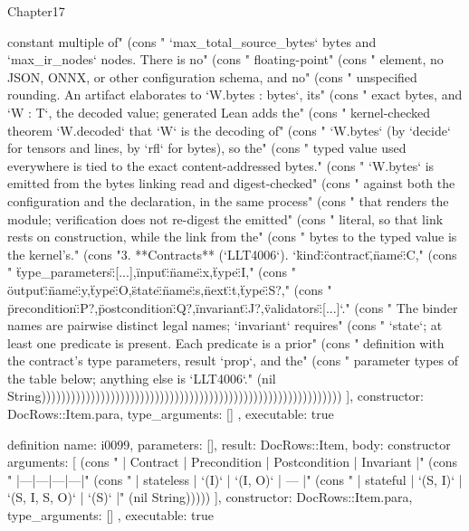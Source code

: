 \begin{lexlean}{Chapter17}
\begin{semanticmodule}
{{constant multiple of" (cons "   `max_total_source_bytes` bytes and `max_ir_nodes` nodes. There is no" (cons "   floating-point" (cons "   element, no JSON, ONNX, or other configuration schema, and no" (cons "   unspecified rounding. An artifact elaborates to `W.bytes : bytes`, its" (cons "   exact bytes, and `W : T`, the decoded value; generated Lean adds the" (cons "   kernel-checked theorem `W.decoded` that `W` is the decoding of" (cons "   `W.bytes` (by `decide` for tensors and lines, by `rfl` for bytes), so the" (cons "   typed value used everywhere is tied to the exact content-addressed bytes." (cons "   `W.bytes` is emitted from the bytes linking read and digest-checked" (cons "   against both the configuration and the declaration, in the same process" (cons "   that renders the module; verification does not re-digest the emitted" (cons "   literal, so that link rests on construction, while the link from the" (cons "   bytes to the typed value is the kernel's." (cons "3. **Contracts** (`LLT4006`). `{\"kind\":\"contract\",\"name\":C," (cons "   \"type_parameters\":[...],\"input\":{\"name\":x,\"type\":I}," (cons "   \"output\":{\"name\":y,\"type\":O},\"state\":{\"name\":s,\"next\":t,\"type\":S}?," (cons "   \"precondition\":P?,\"postcondition\":Q?,\"invariant\":J?,\"validators\":[...]}`." (cons "   The binder names are pairwise distinct legal names; `invariant` requires" (cons "   `state`; at least one predicate is present. Each predicate is a prior" (cons "   definition with the contract's type parameters, result `prop`, and the" (cons "   parameter types of the table below; anything else is `LLT4006`." (nil String)))))))))))))))))))))))))))))))))))))))))))))))))))))))))))))
    ],
    constructor: DocRows::Item.para,
    type_arguments: []
  },
  executable: true
}

definition{
  name: i0099,
  parameters: [],
  result: DocRows::Item,
  body: constructor{
    arguments: [
      (cons "   | Contract | Precondition | Postcondition | Invariant |" (cons "   |---|---|---|---|" (cons "   | stateless | `(I)` | `(I, O)` | — |" (cons "   | stateful | `(S, I)` | `(S, I, S, O)` | `(S)` |" (nil String)))))
    ],
    constructor: DocRows::Item.para,
    type_arguments: []
  },
  executable: true
}


\end{semanticmodule}
\end{lexlean}
